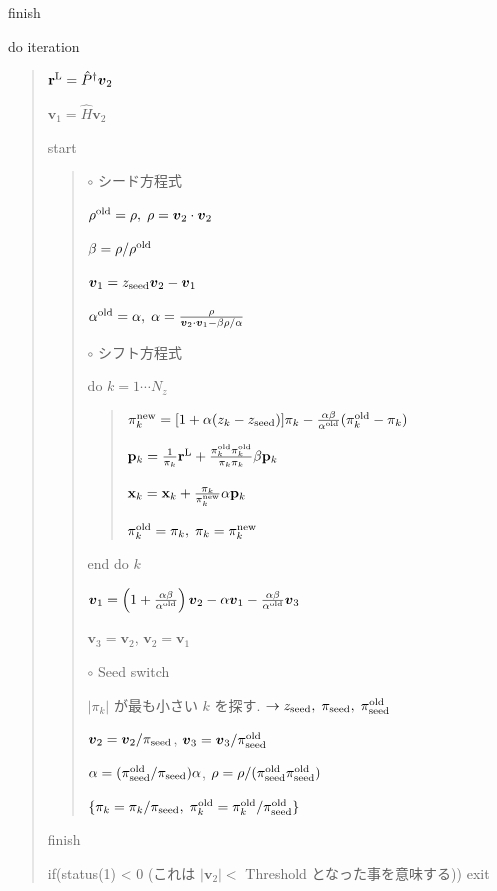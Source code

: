 \documentclass[letterpaper,10pt,dvipdfmx,openany]{sphinxmanual}
\begin{document}
 finish

do iteration
\begin{quote}

\({\bf r}^{\rm L} = {\hat P}^\dagger {\boldsymbol v}_2\)

\({\boldsymbol v}_1 = {\hat H} {\boldsymbol v}_2\)

 start
\begin{quote}

\(\circ\) シード方程式

\(\rho^{\rm old} = \rho,\; \rho = {\boldsymbol v}_2 \cdot {\boldsymbol v}_2\)

\(\beta = \rho / \rho^{\rm old}\)

\({\boldsymbol v}_1 = z_{\rm seed} {\boldsymbol v}_2 - {\boldsymbol v}_1\)

\(\alpha^{\rm old} = \alpha,\; \alpha = \frac{\rho}{{\boldsymbol v}_2 \cdot {\boldsymbol v}_1 - \beta \rho / \alpha }\)

\(\circ\) シフト方程式

do \(k = 1 \cdots N_z\)
\begin{quote}

\(\pi_k^{\rm new} = [1+\alpha(z_k-z_{\rm seed})]\pi_k - \frac{\alpha \beta}{\alpha^{\rm old}}(\pi_k^{\rm old} - \pi_k)\)

\({\bf p}_{k} = \frac{1}{\pi_k} {\bf r}^{\rm L} + \frac{\pi^{\rm old}_k \pi^{\rm old}_k}{\pi_k \pi_k} \beta {\bf p}_{k}\)

\({\bf x}_{k} = {\bf x}_{k} + \frac{\pi_k}{\pi_k^{\rm new}} \alpha {\bf p}_{k}\)

\(\pi_k^{\rm old} = \pi_k,\; \pi_k = \pi_k^{\rm new}\)
\end{quote}

end do \(k\)

\({\boldsymbol v}_1 = \left( 1 + \frac{\alpha \beta}{\alpha^{\rm old}} \right) {\boldsymbol v}_2 - \alpha {\boldsymbol v}_1 - \frac{\alpha \beta}{\alpha^{\rm old}} {\boldsymbol v}_3\)

\({\boldsymbol v}_3 = {\boldsymbol v}_2\),
\({\boldsymbol v}_2 = {\boldsymbol v}_1\)

\(\circ\) Seed switch

\(|\pi_k|\) が最も小さい \(k\) を探す.
\(\rightarrow z_{\rm seed},\; \pi_{\rm seed},\; \pi_{\rm seed}^{\rm old}\)

\({\boldsymbol v}_2 = {\boldsymbol v}_2 / \pi_{\rm seed}\),
\({\boldsymbol v}_3 = {\boldsymbol v}_3 / \pi_{\rm seed}^{\rm old}\)

\(\alpha = (\pi_{\rm seed}^{\rm old} / \pi_{\rm seed}) \alpha\),
\(\rho = \rho / (\pi_{\rm seed}^{\rm old} \pi_{\rm seed}^{\rm old})\)

\(\{\pi_k = \pi_k / \pi_{\rm seed},\; \pi_k^{\rm old} = \pi_k^{\rm old} / \pi_{\rm seed}^{\rm old}\}\)
\end{quote}

 finish

if(status(1) \textless{} 0 (これは \(|{\boldsymbol v}_2| <\) Threshold となった事を意味する)) exit
\end{quote}
\end{document}

